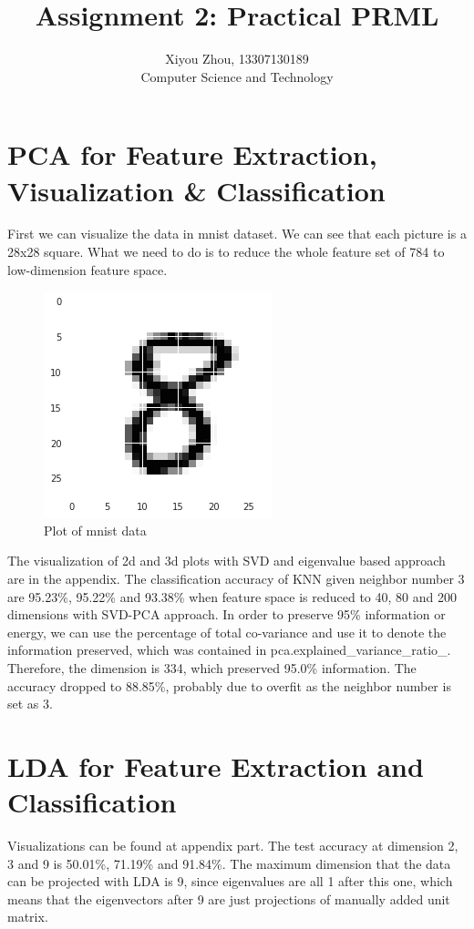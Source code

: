 \documentclass[11pt, oneside]{article}
\begin{document}
\title{Assignment 2: Practical PRML}
\author{Xiyou Zhou, 13307130189 \\ Computer Science and Technology}
\maketitle

\section{PCA for Feature Extraction, Visualization \& Classification}
First we can visualize the data in mnist dataset. We can see that each picture is a 28x28 square. What we need to do is to reduce the whole feature set of 784 to low-dimension feature space.
\begin{figure}[h]
\centering
\includegraphics{./pics/mnist.png}
\caption{Plot of mnist data}
\end{figure}

The visualization of 2d and 3d plots with SVD and eigenvalue based approach are in the appendix.
The classification accuracy of KNN given neighbor number 3 are 95.23\%, 95.22\% and 93.38\% when feature space is reduced to 40, 80 and 200 dimensions with SVD-PCA approach. In order to preserve 95\% information or energy, we can use the percentage of total co-variance and use it to denote the information preserved, which was contained in pca.explained\_variance\_ratio\_. Therefore, the dimension is 334, which preserved 95.0\% information. The accuracy dropped to 88.85\%, probably due to overfit as the neighbor number is set as 3.

\section{LDA for Feature Extraction and Classification}
Visualizations can be found at appendix part. The test accuracy at dimension 2, 3 and 9 is 50.01\%, 71.19\% and 91.84\%. The maximum dimension that the data can be projected with LDA is 9, since eigenvalues are all 1 after this one, which means that the eigenvectors after 9 are just projections of manually added unit matrix.
\end{document}
